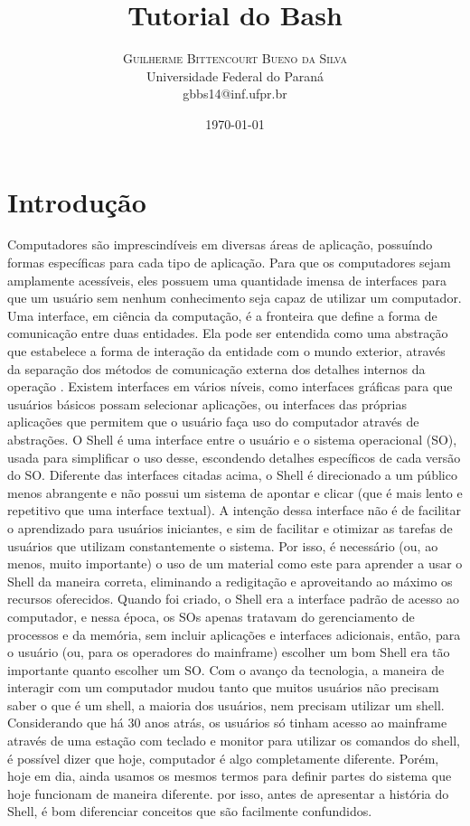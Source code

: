 \documentclass[oneside, 11 pt]{article}
\title{Tutorial do Bash} %
\author{%
	\textsc{Guilherme Bittencourt Bueno da Silva} \\[1ex] %
	\normalsize Universidade Federal do Paraná \\ %
	\normalsize {gbbs14@inf.ufpr.br} %
}
\date{\today} %
\begin{document}
	
	\maketitle
	
	\tableofcontents
	\section{Introdução}
	Computadores são imprescindíveis em diversas áreas de aplicação, possuíndo formas específicas
	para cada tipo de aplicação. Para que os computadores sejam amplamente acessíveis,
	eles possuem uma quantidade imensa de interfaces para que um usuário sem nenhum conhecimento
	seja capaz de utilizar um computador. Uma interface, em ciência da computação, é
	a fronteira que define a forma de comunicação entre duas entidades. Ela pode ser entendida
	como uma abstração que estabelece a forma de interação da entidade com o mundo exterior,
	através da separação dos métodos de comunicação externa dos detalhes internos da operação
	\cite{interface}. Existem interfaces em vários níveis, como interfaces gráficas para
	que usuários básicos possam selecionar aplicações, ou interfaces das próprias aplicações que
	permitem que o usuário faça uso do computador através de abstrações.
	O Shell é uma interface entre o usuário e o sistema operacional (SO), usada para simplificar
	o uso desse, escondendo detalhes específicos de cada versão do SO. Diferente das
	interfaces citadas acima, o Shell é direcionado a um público menos abrangente e não possui
	um sistema de apontar e clicar (que é mais lento e repetitivo que uma interface textual). A
	intenção dessa interface não é de facilitar o aprendizado para usuários iniciantes, e sim de
	facilitar e otimizar as tarefas de usuários que utilizam constantemente o sistema. Por isso, é
	necessário (ou, ao menos, muito importante) o uso de um material como este para aprender
	a usar o Shell da maneira correta, eliminando a redigitação e aproveitando ao máximo os
	recursos oferecidos.
	Quando foi criado, o Shell era a interface padrão de acesso ao computador, e nessa época,
	os SOs apenas tratavam do gerenciamento de processos e da memória, sem incluir aplicações e interfaces adicionais, então, para o usuário (ou, para os operadores do mainframe) escolher
	um bom Shell era tão importante quanto escolher um SO.
	Com o avanço da tecnologia, a maneira de interagir com um computador mudou tanto
	que muitos usuários não precisam saber o que é um shell, a maioria dos usuários, nem
	precisam utilizar um shell. Considerando que há 30 anos atrás, os usuários só tinham acesso
	ao mainframe através de uma estação com teclado e monitor para utilizar os comandos do
	shell, é possível dizer que hoje, computador é algo completamente diferente. Porém, hoje
	em dia, ainda usamos os mesmos termos para definir partes do sistema que hoje funcionam
	de maneira diferente. por isso, antes de apresentar a história do Shell, é bom diferenciar
	conceitos que são facilmente confundidos.
	
\end{document}
